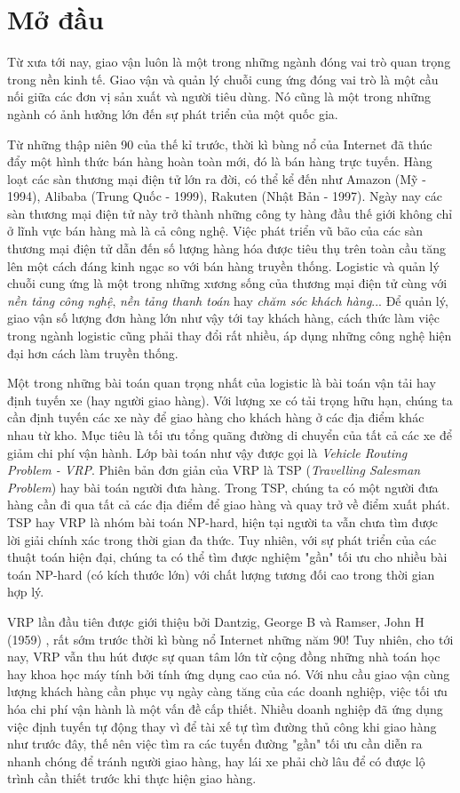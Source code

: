 \chapter{Mở đầu}
\label{chap:introduction}

Từ xưa tới nay, giao vận luôn là một trong những ngành đóng vai trò quan trọng trong nền kinh tế. Giao vận và quản lý chuỗi cung ứng đóng vai trò là một cầu nối giữa các đơn vị sản xuất và người tiêu dùng. Nó cũng là một trong những ngành có ảnh hưởng lớn đến sự phát triển của một quốc gia. 

Từ những thập niên 90 của thế kỉ trước, thời kì bùng nổ của Internet đã thúc đẩy một hình thức bán hàng hoàn toàn mới, đó là bán hàng trực tuyến. Hàng loạt các sàn thương mại điện tử lớn ra đời, có thể kể đến như Amazon (Mỹ - 1994), Alibaba (Trung Quốc - 1999), Rakuten (Nhật Bản - 1997). Ngày nay các sàn thương mại điện tử này trở thành những công ty hàng đầu thế giới không chỉ ở lĩnh vực bán hàng mà là cả công nghệ. Việc phát triển vũ bão của các sàn thương mại điện tử dẫn đến số lượng hàng hóa được tiêu thụ trên toàn cầu tăng lên một cách đáng kinh ngạc so với bán hàng truyền thống. Logistic và quản lý chuỗi cung ứng là một trong những xương sống của thương mại điện tử cùng với \textit{nền tảng công nghệ}, \textit{nền tảng thanh toán} hay \textit{chăm sóc khách hàng}... Để quản lý, giao vận số lượng đơn hàng lớn như vậy tới tay khách hàng, cách thức làm việc trong ngành logistic cũng phải thay đổi rất nhiều, áp dụng những công nghệ hiện đại hơn cách làm truyền thống.

Một trong những bài toán quan trọng nhất của logistic là bài toán vận tải hay định tuyến xe (hay người giao hàng). Với lượng xe có tải trọng hữu hạn, chúng ta cần định tuyến các xe này để giao hàng cho khách hàng ở các địa điểm khác nhau từ kho. Mục tiêu là tối ưu tổng quãng đường di chuyển của tất cả các xe để giảm chi phí vận hành. Lớp bài toán như vậy được gọi là \textit{Vehicle Routing Problem - VRP}. Phiên bản đơn giản của VRP là TSP (\textit{Travelling Salesman Problem}) hay bài toán người đưa hàng. Trong TSP, chúng ta có một người đưa hàng cần đi qua tất cả các địa điểm để giao hàng và quay trở về điểm xuất phát. TSP hay VRP là nhóm bài toán NP-hard, hiện tại người ta vẫn chưa tìm được lời giải chính xác trong thời gian đa thức. Tuy nhiên, với sự phát triển của các thuật toán hiện đại, chúng ta có thể tìm được nghiệm "gần" tối ưu cho nhiều bài toán NP-hard (có kích thước lớn) với chất lượng tương đối cao trong thời gian hợp lý.

VRP lần đầu tiên được giới thiệu bởi Dantzig, George B và Ramser, John H (1959) \cite{dantzig1959truck}, rất sớm trước thời kì bùng nổ Internet những năm 90! Tuy nhiên, cho tới nay, VRP vẫn thu hút được sự quan tâm lớn từ cộng đồng những nhà toán học hay khoa học máy tính bởi tính ứng dụng cao của nó. Với nhu cầu giao vận cùng lượng khách hàng cần phục vụ ngày càng tăng của các doanh nghiệp, việc tối ưu hóa chi phí vận hành là một vấn đề cấp thiết. Nhiều doanh nghiệp đã ứng dụng việc định tuyến tự động thay vì để tài xế tự tìm đường thủ công khi giao hàng như trước đây, thế nên việc tìm ra các tuyến đường "gần" tối ưu cần diễn ra nhanh chóng để tránh người giao hàng, hay lái xe phải chờ lâu để có được lộ trình cần thiết trước khi thực hiện giao hàng. 

